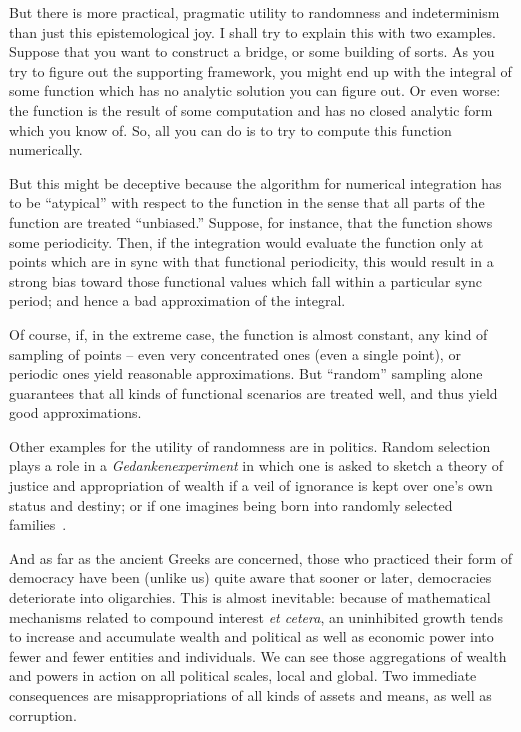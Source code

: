 But there is more practical, pragmatic utility to randomness and indeterminism than just this epistemological joy.
I shall try to explain this with two examples.
Suppose that you want to construct a bridge, or some building of sorts.
As you try to figure out the supporting framework, you might end up with the integral of some function
which has no analytic solution you can figure out.
Or even worse: the function is the result of some computation and has no closed analytic form which you know of.
So, all you can do is to try to compute this function numerically.

But this might be deceptive because the algorithm for numerical integration has to be ``atypical'' with respect to the function
in the sense that all parts of the function are treated  ``unbiased.''
Suppose, for instance, that the function shows some periodicity.
Then, if the integration would evaluate the function only at points which are in sync with that functional periodicity,
this would result in a strong bias toward those functional values which fall within a particular
sync period; and hence a bad approximation of the integral.

Of course, if, in the extreme case, the function is almost constant, any kind of sampling of points -- even very concentrated ones (even a single point),
or periodic ones yield reasonable approximations.
But ``random'' sampling alone guarantees that all kinds of functional scenarios are treated well, and thus yield good approximations.

Other examples for the utility of randomness are in politics.
Random selection plays a role in a {\it Gedankenexperiment} in which one is asked
to sketch a theory of justice and appropriation of wealth if a veil of ignorance is kept over one's own status and destiny;
or if one imagines being born into randomly selected families~\cite{Rawls-1971}.

And as far as the ancient Greeks are concerned,
those who practiced their form of democracy have been (unlike us) quite aware that sooner or later, democracies deteriorate into oligarchies.
This is almost inevitable:
because of mathematical mechanisms related to compound interest {\it et cetera},
an uninhibited growth tends to increase and accumulate wealth and political as well as economic power into fewer and fewer entities
and individuals.
We can see those aggregations of wealth and powers in action on all political scales,
local and global.
Two immediate consequences are misappropriations of all kinds of assets and means, as well as corruption.

